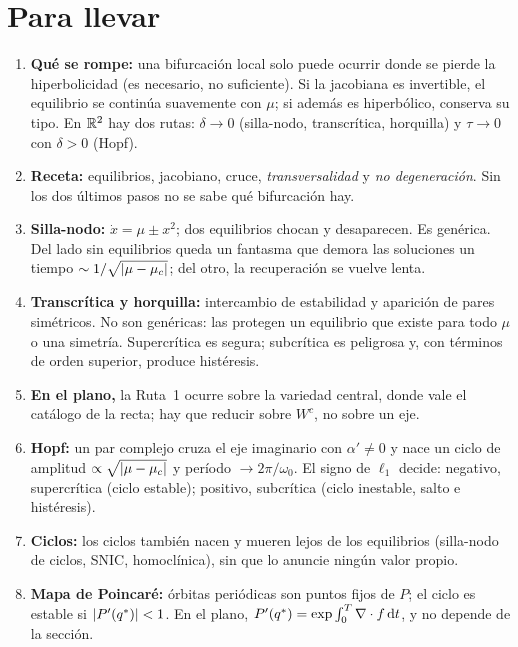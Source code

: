 \section{Para llevar}
\label{sec:bf-cierre}

\begin{parallevar}
\begin{enumerate}
  \item \textbf{Qué se rompe:} una bifurcación local solo puede ocurrir donde se pierde la hiperbolicidad (es necesario, no suficiente). Si la jacobiana es invertible, el equilibrio se continúa suavemente con $\mu$; si además es hiperbólico, conserva su tipo. En $\mathbb{R}^2$ hay dos rutas: $\delta\to0$ (silla-nodo, transcrítica, horquilla) y $\tau\to0$ con $\delta>0$ (Hopf).
  \item \textbf{Receta:} equilibrios, jacobiano, cruce, \emph{transversalidad} y \emph{no degeneración}. Sin los dos últimos pasos no se sabe qué bifurcación hay.
  \item \textbf{Silla-nodo:} $\dot x=\mu\pm x^2$; dos equilibrios chocan y desaparecen. Es genérica. Del lado sin equilibrios queda un fantasma que demora las soluciones un tiempo $\sim1/\sqrt{\left\lvert \mu-\mu_c\right\rvert}$; del otro, la recuperación se vuelve lenta.
  \item \textbf{Transcrítica y horquilla:} intercambio de estabilidad y aparición de pares simétricos. No son genéricas: las protegen un equilibrio que existe para todo $\mu$ o una simetría. Supercrítica es segura; subcrítica es peligrosa y, con términos de orden superior, produce histéresis.
  \item \textbf{En el plano,} la Ruta~1 ocurre sobre la variedad central, donde vale el catálogo de la recta; hay que reducir sobre $W^c$, no sobre un eje.
  \item \textbf{Hopf:} un par complejo cruza el eje imaginario con $\alpha'\neq0$ y nace un ciclo de amplitud $\propto\sqrt{\left\lvert \mu-\mu_c\right\rvert}$ y período $\to2\pi/\omega_0$. El signo de $\ell_1$ decide: negativo, supercrítica (ciclo estable); positivo, subcrítica (ciclo inestable, salto e histéresis).
  \item \textbf{Ciclos:} los ciclos también nacen y mueren lejos de los equilibrios (silla-nodo de ciclos, SNIC, homoclínica), sin que lo anuncie ningún valor propio.
  \item \textbf{Mapa de Poincaré:} órbitas periódicas son puntos fijos de $P$; el ciclo es estable si $\left\lvert P'(q^*)\right\rvert<1$. En el plano, $P'(q^*)=\exp\int_0^T\nabla\cdot f\,\mathrm{d} t$, y no depende de la sección.
\end{enumerate}
\end{parallevar}

